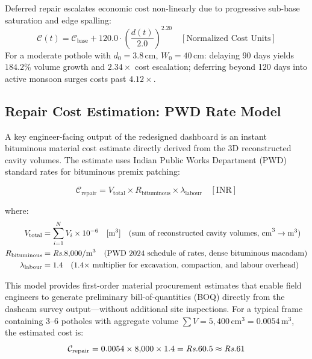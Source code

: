 Deferred repair escalates economic cost non-linearly due to progressive sub-base saturation and edge spalling:
\begin{equation}
    \mathcal{C}(t) = \mathcal{C}_{\text{base}} + 120.0 \cdot \left(\frac{d(t)}{2.0}\right)^{2.20} \quad [\text{Normalized Cost Units}]
    \label{eq:cost_escalation}
\end{equation}
For a moderate pothole with $d_0 = 3.8\,\text{cm}$, $W_0 = 40\,\text{cm}$: delaying 90 days yields $184.2\%$ volume growth and $\mathbf{2.34\times}$ cost escalation; deferring beyond 120 days into active monsoon surges costs past $\mathbf{4.12\times}$.

\subsection{Repair Cost Estimation: PWD Rate Model}

A key engineer-facing output of the redesigned dashboard is an instant bituminous material cost estimate directly derived from the 3D reconstructed cavity volumes. The estimate uses Indian Public Works Department (PWD) standard rates for bituminous premix patching:

\begin{equation}
    \mathcal{C}_{\text{repair}} = V_{\text{total}} \times R_{\text{bituminous}} \times \lambda_{\text{labour}}
    \quad [\text{INR}]
\end{equation}

where:
\begin{align*}
    V_{\text{total}} &= \sum_{i=1}^{N} V_i \times 10^{-6} \quad [\text{m}^3] \quad \text{(sum of reconstructed cavity volumes, cm}^3 \to \text{m}^3\text{)} \\
    R_{\text{bituminous}} &= \text{\textrm{\textit{Rs.}}}8{,}000 / \text{m}^3 \quad \text{(PWD 2024 schedule of rates, dense bituminous macadam)} \\
    \lambda_{\text{labour}} &= 1.4 \quad \text{(1.4$\times$ multiplier for excavation, compaction, and labour overhead)}
\end{align*}

This model provides first-order material procurement estimates that enable field engineers to generate preliminary bill-of-quantities (BOQ) directly from the dashcam survey output---without additional site inspections. For a typical frame containing 3--6 potholes with aggregate volume $\sum V = 5{,}400\,\text{cm}^3 = 0.0054\,\text{m}^3$, the estimated cost is:
\begin{equation}
    \mathcal{C}_{\text{repair}} = 0.0054 \times 8{,}000 \times 1.4 = \text{\textrm{\textit{Rs.}}}60.5 \approx \text{\textrm{\textit{Rs.}}}61
\end{equation}

